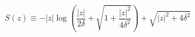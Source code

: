 \documentclass[border=2pt,varwidth]{standalone}
\begin{document}
\[
 S(z) \equiv -|z| \log\left(
  \frac{|z|}{2\delta} + \sqrt{1 + \frac{|z|^2}{4 \delta^2}}
 \right) + \sqrt{|z|^2 + 4 \delta^2}
\]
\end{document}
